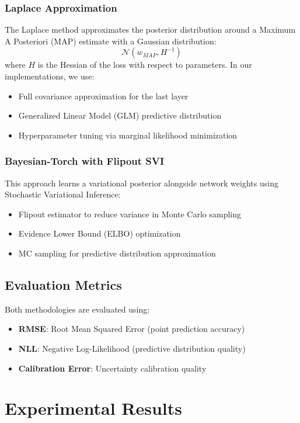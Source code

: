 \documentclass[11pt]{article}
\begin{document}
\subsubsection{Laplace Approximation}
The Laplace method approximates the posterior distribution around a Maximum A Posteriori (MAP) estimate with a Gaussian distribution:
\[
\mathcal{N}(w_{MAP}, H^{-1})
\]
where $H$ is the Hessian of the loss with respect to parameters. In our implementations, we use:
\begin{itemize}
    \item Full covariance approximation for the last layer
    \item Generalized Linear Model (GLM) predictive distribution
    \item Hyperparameter tuning via marginal likelihood minimization
\end{itemize}

\subsubsection{Bayesian-Torch with Flipout SVI}
This approach learns a variational posterior alongside network weights using Stochastic Variational Inference:
\begin{itemize}
    \item Flipout estimator to reduce variance in Monte Carlo sampling
    \item Evidence Lower Bound (ELBO) optimization
    \item MC sampling for predictive distribution approximation
\end{itemize}

\subsection{Evaluation Metrics}
Both methodologies are evaluated using:
\begin{itemize}
    \item \textbf{RMSE}: Root Mean Squared Error (point prediction accuracy)
    \item \textbf{NLL}: Negative Log-Likelihood (predictive distribution quality)
    \item \textbf{Calibration Error}: Uncertainty calibration quality
\end{itemize}

\section{Experimental Results}
\end{document}
